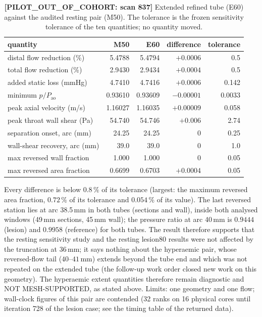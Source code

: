 \documentclass[11pt]{article}
\begin{document}
\begin{table}[H]
\centering
\caption{\textbf{[PILOT\_OUT\_OF\_COHORT: scan 837]} Extended refined tube (E60) against the audited resting pair (M50). The tolerance is the frozen sensitivity tolerance of the ten quantities; no quantity moved.}
\label{tab:e60}
\small
\begin{tabular}{lrrrr}
\toprule
quantity & M50 & E60 & difference & tolerance \\
\midrule
distal flow reduction (\%) & 5.4788 & 5.4794 & $+0.0006$ & 0.5 \\
total flow reduction (\%) & 2.9430 & 2.9434 & $+0.0004$ & 0.5 \\
added static loss (mmHg) & 4.7410 & 4.7416 & $+0.0006$ & 0.142 \\
minimum $p/P_\text{ao}$ & 0.93610 & 0.93609 & $-0.00001$ & 0.0033 \\
peak axial velocity (m/s) & 1.16027 & 1.16035 & $+0.00009$ & 0.058 \\
peak throat wall shear (Pa) & 54.740 & 54.746 & $+0.006$ & 2.74 \\
separation onset, arc (mm) & 24.25 & 24.25 & 0 & 0.25 \\
wall-shear recovery, arc (mm) & 39.0 & 39.0 & 0 & 1.0 \\
max reversed wall fraction & 1.000 & 1.000 & 0 & 0.05 \\
max reversed area fraction & 0.6699 & 0.6703 & $+0.0004$ & 0.05 \\
\bottomrule
\end{tabular}
\end{table}

Every difference is below $0.8\,\%$ of its tolerance (largest: the maximum reversed area fraction, $0.72\,\%$ of its tolerance and $0.054\,\%$ of its value). The last reversed station lies at arc 38.5\,mm in both tubes (sections and wall), inside both analysed windows (49\,mm sections, 45\,mm wall); the pressure ratio at arc 40\,mm is $0.9444$ (lesion) and $0.9958$ (reference) for both tubes. The result therefore supports that the resting sensitivity study and the resting lesion80 results were not affected by the truncation at 36\,mm; it says nothing about the hyperaemic pair, whose reversed-flow tail ($40$--$41$\,mm) extends beyond the tube end and which was not repeated on the extended tube (the follow-up work order closed new work on this geometry). The hyperaemic extent quantities therefore remain diagnostic and NOT MESH-SUPPORTED, as stated above. Limits: one geometry and one flow; wall-clock figures of this pair are contended (32 ranks on 16 physical cores until iteration 728 of the lesion case; see the timing table of the returned data).
\end{document}
